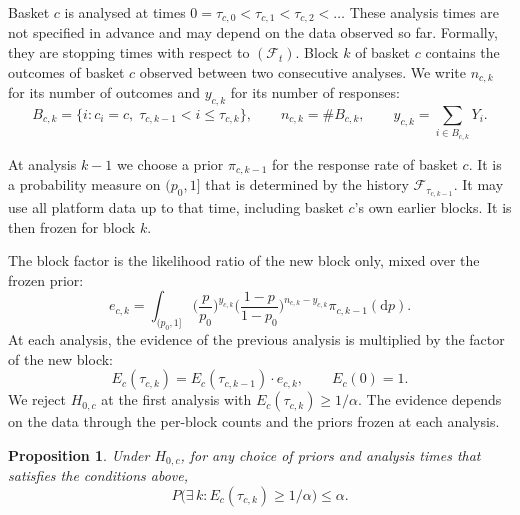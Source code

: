 \documentclass[11pt,a4paper]{article}
\newtheorem{proposition}{Proposition}
\theoremstyle{definition}
\theoremstyle{remark}
\newcommand{\F}{\mathcal{F}}
\begin{document}
Basket $c$ is analysed at times $0 = \tau_{c,0} < \tau_{c,1} < \tau_{c,2} < \dots$
These analysis times are not specified in advance and may depend on the data observed so far.
Formally, they are stopping times with respect to $(\F_t)$.
Block $k$ of basket $c$ contains the outcomes of basket $c$ observed between two consecutive analyses.
We write $n_{c,k}$ for its number of outcomes and $y_{c,k}$ for its number of responses:
\begin{equation}\label{eq:blocks}
  B_{c,k} = \{ i : c_i = c,\; \tau_{c,k-1} < i \le \tau_{c,k} \}, \qquad
  n_{c,k} = \# B_{c,k}, \qquad
  y_{c,k} = \sum_{i \in B_{c,k}} Y_i .
\end{equation}

At analysis $k-1$ we choose a prior $\pi_{c,k-1}$ for the response rate of basket $c$.
It is a probability measure on $(p_0, 1]$ that is determined by the history $\F_{\tau_{c,k-1}}$.
It may use all platform data up to that time, including basket $c$'s own earlier blocks.
It is then frozen for block $k$.

The block factor is the likelihood ratio of the new block only, mixed over the frozen prior:
\begin{equation}\label{eq:factor}
  e_{c,k} = \int_{(p_0,1]} \Big(\frac{p}{p_0}\Big)^{y_{c,k}} \Big(\frac{1-p}{1-p_0}\Big)^{n_{c,k}-y_{c,k}} \pi_{c,k-1}(\mathrm dp).
\end{equation}
At each analysis, the evidence of the previous analysis is multiplied by the factor of the new block:
\begin{equation}\label{eq:update}
  E_c(\tau_{c,k}) = E_c(\tau_{c,k-1}) \cdot e_{c,k}, \qquad E_c(0) = 1 .
\end{equation}
We reject $H_{0,c}$ at the first analysis with $E_c(\tau_{c,k}) \ge 1/\alpha$.
The evidence depends on the data through the per-block counts and the priors frozen at each analysis.

\begin{proposition}\label{prop:validity}
Under $H_{0,c}$, for any choice of priors and analysis times that satisfies the conditions above,
\begin{equation}\label{eq:ville}
  P\big( \exists\, k : E_c(\tau_{c,k}) \ge 1/\alpha \big) \le \alpha .
\end{equation}
\end{proposition}
\end{document}

